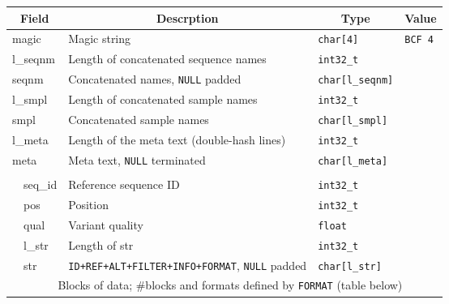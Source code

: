 \documentclass[10pt,pdftex]{article}
\begin{document}
\begin{center}
\begin{tabular}{|l|l|l|l|l|}
\hline
\multicolumn{2}{|c|}{\bf Field} & \multicolumn{1}{c|}{\bf Descrption} & \multicolumn{1}{c|}{\bf Type} & \multicolumn{1}{c|}{\bf Value} \\\hline\hline
\multicolumn{2}{|l|}{\sf magic} & Magic string & {\tt char[4]} & {\tt BCF\char92 4} \\\hline
\multicolumn{2}{|l|}{\sf l\_seqnm} & Length of concatenated sequence names & {\tt int32\_t} & \\\hline
\multicolumn{2}{|l|}{\sf seqnm} & Concatenated names, {\tt NULL} padded & {\tt char[{\sf l\_seqnm}]} & \\\hline
\multicolumn{2}{|l|}{\sf l\_smpl} & Length of concatenated sample names & {\tt int32\_t} & \\\hline
\multicolumn{2}{|l|}{\sf smpl} & Concatenated sample names & {\tt char[{\sf l\_smpl}]} & \\\hline
\multicolumn{2}{|l|}{\sf l\_meta} & Length of the meta text (double-hash lines)& {\tt int32\_t} & \\\hline
\multicolumn{2}{|l|}{\sf meta} & Meta text, {\tt NULL} terminated & {\tt char[{\sf l\_meta}]} & \\\hline
\multicolumn{5}{|c|}{\it \color{gray}{List of records until the end of the file}}\\\cline{2-5}
& {\sf seq\_id} & Reference sequence ID & {\tt int32\_t} & \\\cline{2-5}
& {\sf pos} & Position & {\tt int32\_t} & \\\cline{2-5}
& {\sf qual} & Variant quality & {\tt float} & \\\cline{2-5}
& {\sf l\_str} & Length of {\sf str} & {\tt int32\_t} & \\\cline{2-5}
& {\sf str} & {\tt ID+REF+ALT+FILTER+INFO+FORMAT}, {\tt NULL} padded & {\tt char[{\sf l\_str}]} &\\\cline{2-5}
& \multicolumn{4}{c|}{Blocks of data; \#blocks and formats defined by {\tt FORMAT} (table below)}\\
\hline
\end{tabular}
\end{center}
\end{document}
